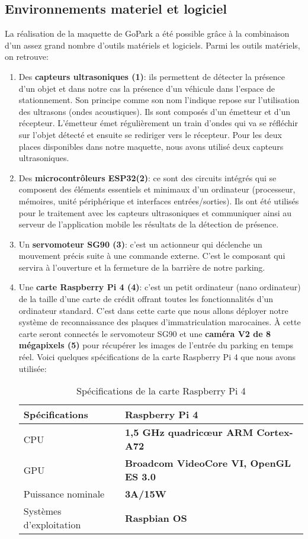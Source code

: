     \subsection{Environnements materiel et logiciel}
    La réalisation de la maquette de GoPark a été possible grâce à la combinaison d’un assez grand nombre d’outils matériels et logiciels. Parmi les outils matériels, on retrouve:
    \begin{enumerate}
        \item Des \textbf{capteurs ultrasoniques (1)}: ils permettent de détecter la présence d’un objet et dans notre cas la présence d’un véhicule dans l’espace de stationnement. Son principe comme son nom l’indique repose sur l’utilisation des ultrasons (ondes acoustiques). Ils sont composés d’un émetteur et d’un récepteur. L’émetteur émet régulièrement un train d’ondes qui va se réfléchir sur l’objet détecté et ensuite se rediriger vers le récepteur. Pour les deux places disponibles dans notre maquette, nous avons utilisé deux capteurs ultrasoniques.
        \item Des \textbf{microcontrôleurs ESP32(2)}: ce sont des circuits intégrés qui se composent des éléments essentiels et minimaux d’un ordinateur (processeur, mémoires, unité périphérique et interfaces entrées/sorties). Ils ont été utilisés pour le traitement avec les capteurs ultrasoniques et communiquer ainsi au serveur de l’application mobile les résultats de la détection de présence.
        \item Un \textbf{servomoteur SG90 (3)}:  c’est un actionneur qui déclenche un mouvement précis suite à une commande externe. C’est le composant qui servira à l’ouverture et la fermeture de la barrière de notre parking.
        \item Une \textbf{carte Raspberry Pi 4 (4)}: c'est un petit ordinateur (nano ordinateur) de la taille d'une carte de crédit offrant toutes les fonctionnalités d’un ordinateur standard. C’est dans cette carte que nous allons déployer notre système de reconnaissance des plaques d’immatriculation marocaines. À cette carte seront connectés le servomoteur SG90 et une \textbf{caméra V2 de 8 mégapixels (5)} pour récupérer les images de l’entrée du parking en temps réel. Voici quelques spécifications de la carte Raspberry Pi 4 que nous avons utilisée:
        \begin{table}[H]
            \centering
            \begin{tabular}{|l|l|}
                \hline
                \rowcolor{Gray}
                \textbf{Spécifications} & \textbf{Raspberry Pi 4} \\ \hline
                CPU & \textbf{1,5 GHz quadricœur ARM Cortex-A72} \\ \hline
                GPU & \textbf{Broadcom VideoCore VI, OpenGL ES 3.0} \\ \hline
                Puissance nominale  & \textbf{3A/15W} \\ \hline
                Systèmes d’exploitation & \textbf{Raspbian OS} \\ \hline
            \end{tabular}
            \caption{Spécifications de la carte Raspberry Pi 4}
        \end{table}
    \end{enumerate}
